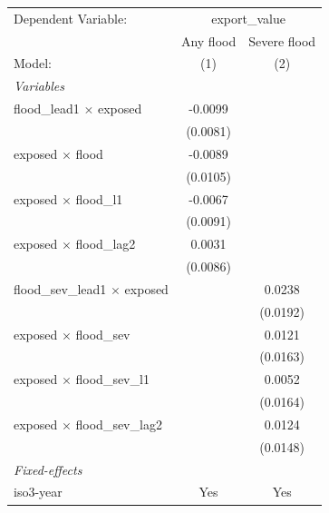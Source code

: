 
\begingroup
\centering
\begin{tabular}{lcc}
   \tabularnewline \midrule \midrule
   Dependent Variable: & \multicolumn{2}{c}{export\_value}\\
                                         & Any flood             & Severe flood \\   
   Model:                                & (1)                   & (2)\\  
   \midrule
   \emph{Variables}\\
   flood\_lead1 $\times$ exposed         & -0.0099               &   \\   
                                         & (0.0081)              &   \\   
   exposed $\times$ flood                & -0.0089               &   \\   
                                         & (0.0105)              &   \\   
   exposed $\times$ flood\_l1            & -0.0067               &   \\   
                                         & (0.0091)              &   \\   
   exposed $\times$ flood\_lag2          & 0.0031                &   \\   
                                         & (0.0086)              &   \\   
   flood\_sev\_lead1 $\times$ exposed    &                       & 0.0238\\   
                                         &                       & (0.0192)\\   
   exposed $\times$ flood\_sev           &                       & 0.0121\\   
                                         &                       & (0.0163)\\   
   exposed $\times$ flood\_sev\_l1       &                       & 0.0052\\   
                                         &                       & (0.0164)\\   
   exposed $\times$ flood\_sev\_lag2     &                       & 0.0124\\   
                                         &                       & (0.0148)\\   
   \midrule
   \emph{Fixed-effects}\\
   iso3-year                             & Yes                   & Yes\\  

\end{tabular}
